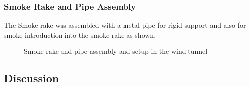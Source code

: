 \subsubsection{Smoke Rake and Pipe Assembly}
The Smoke rake was assembled with a metal pipe for rigid support and also for smoke introduction into the
smoke rake as shown.
\begin{figure}[!htb]%
	\centering
	\qquad
	\caption[Final rake and pipe]{Smoke rake and pipe assembly and setup in the wind tunnel}%
	\label{fig:result}%
\end{figure}

\subsection{Discussion}